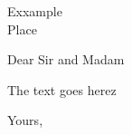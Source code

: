 \documentclass{letter}
\begin{document}
 
    \begin{letter}{Exxample\\Place}
    
        \opening{Dear Sir and Madam}

        The text goes herez

        \closing{Yours,}

    \end{letter} 
\end{document}
